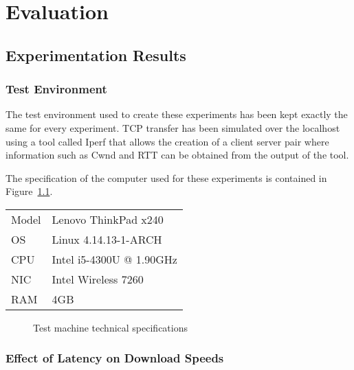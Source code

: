 \chapter{Evaluation}


\section{Experimentation Results}
\subsection{Test Environment}
The test environment used to create these experiments has been kept exactly the same for every experiment. TCP transfer has been simulated over the localhost using a tool called Iperf \citep{gates2003iperf} that allows the creation of a client server pair where information such as Cwnd and RTT can be obtained from the output of the tool.

The specification of the computer used for these experiments is contained in Figure~\ref{ref:testmachine}.

\begin{center}
\begin{tabular}{| l | l |}
	\hline
	Model	& Lenovo ThinkPad x240			\\
	OS 		& Linux 4.14.13-1-ARCH			\\
	CPU 	& Intel i5-4300U @ 1.90GHz		\\
	NIC		& Intel Wireless 7260			\\
	RAM		& 4GB							\\
	\hline
\end{tabular}
\begin{figure}[h]
	\caption{Test machine technical specifications}
	\label{ref:testmachine}
\end{figure}
\end{center}

\subsection{Effect of Latency on Download Speeds}


